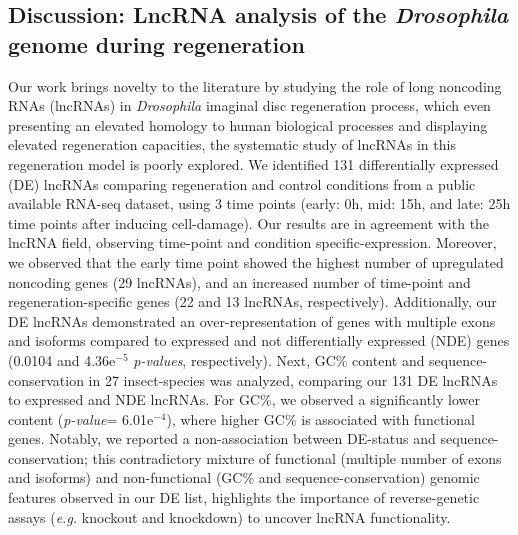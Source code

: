 \clearpage

\subsection{Discussion: LncRNA analysis of the \textit{Drosophila} genome during regeneration}
\label{sec:dme-discussion}

Our work brings novelty to the literature by studying the role of long noncoding RNAs (lncRNAs) in \textit{Drosophila} imaginal disc regeneration process, which even presenting an elevated homology to human biological processes and displaying elevated regeneration capacities,\autocite{vizcaya_2020_chromatin,ji_2019_understanding} the systematic study of lncRNAs in this regeneration model is poorly explored. We identified 131 differentially expressed (DE) lncRNAs comparing regeneration and control conditions from a public available RNA-seq dataset, using 3 time points (early: 0h, mid: 15h, and late: 25h time points after inducing cell-damage). Our results are in agreement with the lncRNA field, observing time-point and condition specific-expression. Moreover, we observed that the early time point showed the highest number of upregulated noncoding genes (29 lncRNAs), and an increased number of time-point and regeneration-specific genes (22 and 13 lncRNAs, respectively). Additionally, our DE lncRNAs demonstrated an over-representation of genes with multiple exons and isoforms compared to expressed and not differentially expressed (NDE) genes (0.0104 and 4.36e$^{-5}$ \textit{p-values}, respectively). Next, GC\% content and sequence-conservation in 27 insect-species was analyzed, comparing our 131 DE lncRNAs to expressed and NDE lncRNAs. For GC\%, we observed a significantly lower content (\textit{p-value}= 6.01e$^{-4}$), where higher GC\% is associated with functional genes.\autocite{liu_2017_crispri} Notably, we reported a non-association between DE-status and sequence-conservation; this contradictory mixture of functional (multiple number of exons and isoforms) and non-functional (GC\% and sequence-conservation) genomic features observed in our DE list, highlights the importance of reverse-genetic assays (\textit{e.g.} knockout and knockdown) to uncover lncRNA functionality.

